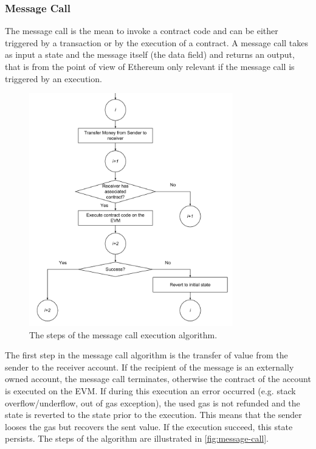 \subsubsection{Message Call}
\label{sec:message-call}
The message call is the mean to invoke a contract code and can be either
triggered by a transaction or by the execution of a contract. A message call
takes as input a state and the message itself (the data field) and returns an
output, that is from the point of view of Ethereum only relevant if the message
call is triggered by an execution.

\begin{figure}[h!]
	\begin{center}
		\includegraphics[width=0.79\textwidth]{./res/img/message-call.pdf}
	\end{center}
	\caption{The steps of the message call execution algorithm.}
	\label{fig:message-call}
\end{figure}

The first step in the message call algorithm is the transfer of value from the
sender to the receiver account. If the recipient of the message is an externally
owned account, the message call terminates, otherwise the contract of the
account is executed on the EVM. If during this execution an error occurred (e.g.
stack overflow/underflow, out of gas exception), the used gas is not refunded
and the state is reverted to the state prior to the execution. This means that
the sender looses the gas but recovers the sent value. If the execution succeed,
this state persists. The steps of the algorithm are illustrated in
\autoref{fig:message-call}.